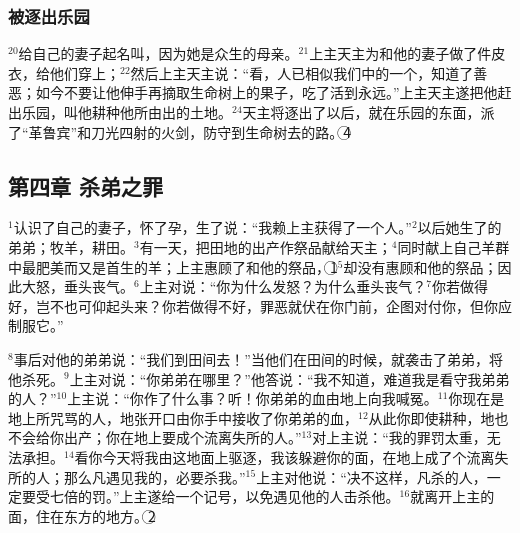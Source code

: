 \subsubsection{被逐出乐园}
$^{20}$\UL[亚当]给自己的妻子起名叫\UL[厄娃]，因为她是众生的母亲。$^{21}$上主天主为\UL[亚当]和他的妻子做了件皮衣，给他们穿上；$^{22}$然后上主天主说：“看，人已相似我们中的一个，知道了善恶；如今不要让他伸手再摘取生命树上的果子，吃了活到永远。”上主天主遂把他赶出\UL[伊甸]乐园，叫他耕种他所由出的土地。$^{24}$天主将\UL[亚当]逐出了以后，就在\UL[伊甸]乐园的东面，派了“革鲁宾”和刀光四射的火剑，防守到生命树去的路。\textcircled{4}


\subsection{第四章 杀弟之罪}
$^{1}$\UL[亚当]认识了自己的妻子\UL[厄娃]，\UL[厄娃]怀了孕，生了\UL[加音]说：“我赖上主获得了一个人。”$^{2}$以后她生了\UL[加音]的弟弟\UL[亚伯尔]；\UL[亚伯尔]牧羊，\UL[加音]耕田。$^{3}$有一天，\UL[加音]把田地的出产作祭品献给天主；$^{4}$同时\UL[亚伯尔]献上自己羊群中最肥美而又是首生的羊；上主惠顾了\UL[亚伯尔]和他的祭品，\textcircled{1}$^{5}$却没有惠顾\UL[加音]和他的祭品；因此\UL[加音]大怒，垂头丧气。$^{6}$上主对\UL[加音]说：“你为什么发怒？为什么垂头丧气？$^{7}$你若做得好，岂不也可仰起头来？你若做得不好，罪恶就伏在你门前，企图对付你，但你应制服它。”

$^{8}$事后\UL[加音]对他的弟弟\UL[亚伯尔]说：“我们到田间去！”当他们在田间的时候，\UL[加音]就袭击了弟弟\UL[亚伯尔]，将他杀死。$^{9}$上主对\UL[加音]说：“你弟弟\UL[亚伯尔]在哪里？”他答说：“我不知道，难道我是看守我弟弟的人？”$^{10}$上主说：“你作了什么事？听！你弟弟的血由地上向我喊冤。$^{11}$你现在是地上所咒骂的人，地张开口由你手中接收了你弟弟的血，$^{12}$从此你即使耕种，地也不会给你出产；你在地上要成个流离失所的人。”$^{13}$\UL[加音]对上主说：“我的罪罚太重，无法承担。$^{14}$看你今天将我由这地面上驱逐，我该躲避你的面，在地上成了个流离失所的人；那么凡遇见我的，必要杀我。”$^{15}$上主对他说：“决不这样，凡杀\UL[加音]的人，一定要受七倍的罚。”上主遂给\UL[加音]一个记号，以免遇见他的人击杀他。$^{16}$\UL[加音]就离开上主的面，住在\UL[伊甸]东方的\UL[诺得]地方。\textcircled{2}


